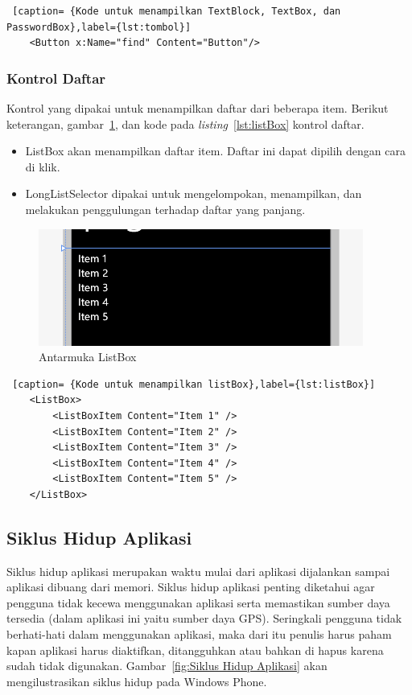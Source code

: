 \begin{lstlisting} [caption= {Kode untuk menampilkan TextBlock, TextBox, dan PasswordBox},label={lst:tombol}]
	<Button x:Name="find" Content="Button"/>
\end{lstlisting}

\subsubsection{Kontrol Daftar}
\label{subsubsec:Kontrol Daftar}
\hspace{0.5cm} Kontrol yang dipakai untuk menampilkan daftar dari beberapa item. Berikut keterangan, gambar~\ref{fig:antarmukaListBox}, dan kode pada \textit{listing}~\ref{lst:listBox} kontrol daftar. 

\begin{itemize}
	\item ListBox akan menampilkan daftar item. Daftar ini dapat dipilih dengan cara di klik.
	\item LongListSelector dipakai untuk mengelompokan, menampilkan, dan melakukan penggulungan terhadap daftar yang panjang.
\end{itemize}

\begin{figure}[h]
	\centering
		\includegraphics[scale=0.4]{Gambar/kontrol/listBox.PNG}
	\caption{Antarmuka ListBox}
	\label{fig:antarmukaListBox}
\end{figure}

\begin{lstlisting} [caption= {Kode untuk menampilkan listBox},label={lst:listBox}]
	<ListBox>
		<ListBoxItem Content="Item 1" />
		<ListBoxItem Content="Item 2" />
		<ListBoxItem Content="Item 3" />
		<ListBoxItem Content="Item 4" />
		<ListBoxItem Content="Item 5" />
	</ListBox>
\end{lstlisting}

\subsection{Siklus Hidup Aplikasi}
\label{subsec:Siklus Hidup Aplikasi}
\hspace{0.5cm} Siklus hidup aplikasi merupakan waktu mulai dari aplikasi dijalankan sampai aplikasi dibuang dari memori. Siklus hidup aplikasi penting diketahui agar pengguna tidak kecewa menggunakan aplikasi serta memastikan sumber daya tersedia (dalam aplikasi ini yaitu sumber daya GPS). Seringkali pengguna tidak berhati-hati dalam menggunakan aplikasi, maka dari itu penulis harus paham kapan aplikasi harus diaktifkan, ditangguhkan atau bahkan di hapus karena sudah tidak digunakan. Gambar~\ref{fig:Siklus Hidup Aplikasi} akan mengilustrasikan siklus hidup pada Windows Phone.


